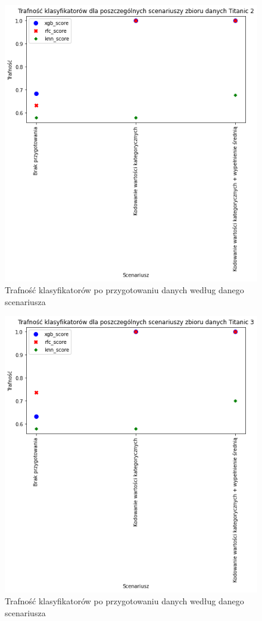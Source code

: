 \documentclass{book}
\begin{document}
\begin{figure}[H]
\centerline{\includegraphics{Titanic_2_Kodowanie}}
\centering
\caption{Trafność klasyfikatorów po przygotowaniu danych 
według danego scenariusza}
\end{figure}

\begin{figure}[H]
\centerline{\includegraphics{Titanic_3_Kodowanie}}
\centering
\caption{Trafność klasyfikatorów po przygotowaniu danych 
według danego scenariusza}
\end{figure}
\end{document}
